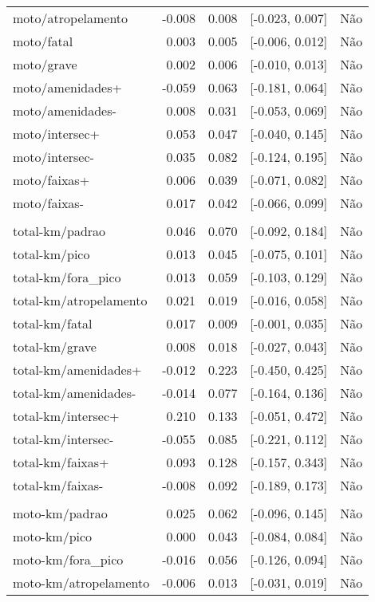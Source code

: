\begin{longtable}{lrrcl}
moto/atropelamento & -0.008 & 0.008 & {}[-0.023, 0.007] & Não\\
moto/fatal & 0.003 & 0.005 & {}[-0.006, 0.012] & Não\\
moto/grave & 0.002 & 0.006 & {}[-0.010, 0.013] & Não\\
moto/amenidades+ & -0.059 & 0.063 & {}[-0.181, 0.064] & Não\\
moto/amenidades- & 0.008 & 0.031 & {}[-0.053, 0.069] & Não\\
moto/intersec+ & 0.053 & 0.047 & {}[-0.040, 0.145] & Não\\
moto/intersec- & 0.035 & 0.082 & {}[-0.124, 0.195] & Não\\
moto/faixas+ & 0.006 & 0.039 & {}[-0.071, 0.082] & Não\\
moto/faixas- & 0.017 & 0.042 & {}[-0.066, 0.099] & Não\\
 &  &  &  & \\
total-km/padrao & 0.046 & 0.070 & {}[-0.092, 0.184] & Não\\
total-km/pico & 0.013 & 0.045 & {}[-0.075, 0.101] & Não\\
total-km/fora\_pico & 0.013 & 0.059 & {}[-0.103, 0.129] & Não\\
total-km/atropelamento & 0.021 & 0.019 & {}[-0.016, 0.058] & Não\\
total-km/fatal & 0.017 & 0.009 & {}[-0.001, 0.035] & Não\\
total-km/grave & 0.008 & 0.018 & {}[-0.027, 0.043] & Não\\
total-km/amenidades+ & -0.012 & 0.223 & {}[-0.450, 0.425] & Não\\
total-km/amenidades- & -0.014 & 0.077 & {}[-0.164, 0.136] & Não\\
total-km/intersec+ & 0.210 & 0.133 & {}[-0.051, 0.472] & Não\\
total-km/intersec- & -0.055 & 0.085 & {}[-0.221, 0.112] & Não\\
total-km/faixas+ & 0.093 & 0.128 & {}[-0.157, 0.343] & Não\\
total-km/faixas- & -0.008 & 0.092 & {}[-0.189, 0.173] & Não\\
 &  &  &  & \\
moto-km/padrao & 0.025 & 0.062 & {}[-0.096, 0.145] & Não\\
moto-km/pico & 0.000 & 0.043 & {}[-0.084, 0.084] & Não\\
moto-km/fora\_pico & -0.016 & 0.056 & {}[-0.126, 0.094] & Não\\
moto-km/atropelamento & -0.006 & 0.013 & {}[-0.031, 0.019] & Não\\

\end{longtable}
